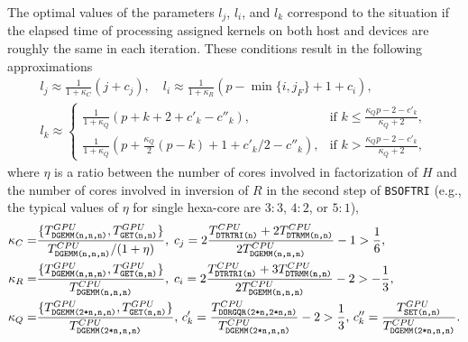 \documentclass{llncs}
\newcommand{\Bsoftri}{\texttt{BSOFTRI}\xspace}
\begin{document}
The optimal values of the parameters $l_j$, $l_i$, and $l_k$ 
correspond to the situation 
if the elapsed time of processing assigned kernels
on both host and devices are roughly the same in each iteration. 
These conditions result in the following approximations 
\begin{align}
  \label{eq:l_j}
  l_j \approx \frac{1}{1 + \kappa_C} \left(j + c_j \right)
  , \quad %
  l_i \approx \frac{1}{1 + \kappa_R} \left( p-\min\{i,j_F\}+1 + c_i \right), 
  \\
  \label{eq:l_k}
    l_k \approx 
    \begin{cases}
        \displaystyle \frac{1}{1 + \kappa_Q} \left( p+k + 2 +c'_k - c''_k\right),
      & \mbox{if } k \leq \displaystyle \frac{ \kappa_{Q} p -2 - c'_{k}}{\kappa_{Q} + 2},\\ %
        \displaystyle \frac{1}{1 + \kappa_Q} \left(p  + \frac{\kappa_Q}{2}(p-k) + 1 + c'_k/2 - c''_k\right),
      & \mbox{if } k > \displaystyle \frac{ \kappa_{Q} p -2 - c'_{k}}{\kappa_{Q} + 2}, %
    \end{cases}
\end{align}
where $\eta$ is a ratio between the number of cores involved in factorization of $H$
and the number of cores involved in inversion of $R$ in the second step of \Bsoftri 
(e.g., the typical values of $\eta$ for single hexa-core are $3:3$, $4:2$, or $5:1$),
\begin{align*}
  \kappa_C =& \frac{\{T_{\texttt{DGEMM(n,n,n)}}^{GPU},T^{GPU}_{\texttt{GET(n,n)}}\}}{T^{CPU}_{\texttt{DGEMM(n,n,n)}} / (1 + \eta)} 
  , \;
  c_j = 2 \frac{T^{CPU}_{\texttt{DTRTRI(n)}} + 2 T^{CPU}_{\texttt{DTRMM(n,n)}}}{2 T^{CPU}_{\texttt{DGEMM(n,n,n)}}} - 1 > \frac{1}{6}
  ,\;
  \\
  \kappa_R =& \frac{\{T_{\texttt{DGEMM(n,n,n)}}^{GPU},T^{GPU}_{\texttt{GET(n,n)}}\}}{T^{CPU}_{\texttt{DGEMM(n,n,n)}}} 
  , \;
  c_i = 
  2 \frac{T^{CPU}_{\texttt{DTRTRI(n)}} + 3T^{CPU}_{\texttt{DTRMM(n,n)}}}{2 T^{CPU}_{\texttt{DGEMM(n,n,n)}}} - 2 > -\frac{1}{3},
  \\
  \kappa_Q  =& \frac{\{T_{\texttt{DGEMM(2*n,n,n)}}^{GPU},T^{GPU}_{\texttt{GET(n,n)}}\}}{T^{CPU}_{\texttt{DGEMM(2*n,n,n)}}} 
  , \,
  c'_k  = \frac{T^{CPU}_\texttt{DORGQR(2*n,2*n,n)}}{T^{CPU}_\texttt{DGEMM(2*n,n,n)}} - 2 > \frac{1}{3}
  , \,
  c''_k = {%
    \frac{T^{GPU}_{\texttt{SET(n,n)}}}{%
    T_{\texttt{DGEMM(2*n,n,n)}}^{CPU}}}
  .
\end{align*}
\end{document}
